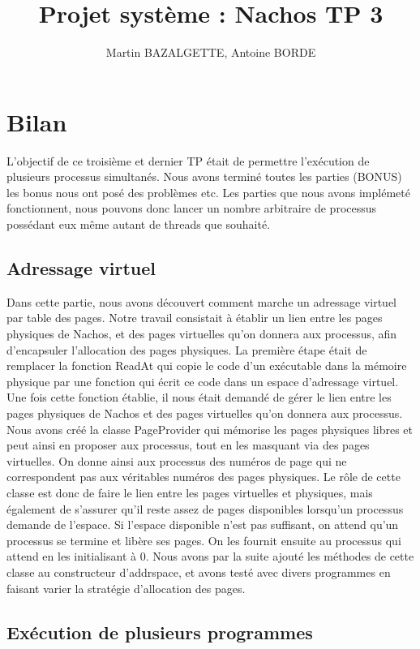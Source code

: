 \documentclass[12pt]{article}
\begin{document}
\title{Projet système : Nachos TP 3}
\author{Martin BAZALGETTE, Antoine BORDE}
\maketitle

\newpage
\tableofcontents
\newpage

\section{Bilan}
L'objectif de ce troisième et dernier TP était de permettre l'exécution de plusieurs processus simultanés.
Nous avons terminé toutes les parties (BONUS) les bonus nous ont posé des problèmes etc.
Les parties que nous avons implémeté fonctionnent, nous pouvons donc lancer un nombre arbitraire de processus possédant eux même autant de threads que souhaité.

\subsection{Adressage virtuel}

Dans cette partie, nous avons découvert comment marche un adressage virtuel par table des pages. Notre travail consistait à établir un lien entre les pages physiques de Nachos, et des pages virtuelles qu'on donnera aux processus, afin d'encapsuler l'allocation des pages physiques.
\newline
La première étape était de remplacer la fonction ReadAt qui copie le code d'un exécutable dans la mémoire physique par une fonction qui écrit ce code dans un espace d'adressage virtuel.
\newline
Une fois cette fonction établie, il nous était demandé de gérer le lien entre les pages physiques de Nachos et des pages virtuelles qu'on donnera aux processus.
Nous avons créé la classe PageProvider qui mémorise les pages physiques libres et peut ainsi en proposer aux processus, tout en les masquant via des pages virtuelles. On donne ainsi aux processus des numéros de page qui ne correspondent pas aux véritables numéros des pages physiques. Le rôle de cette classe est donc de faire le lien entre les pages virtuelles et physiques, mais également de s'assurer qu'il reste assez de pages disponibles lorsqu'un processus demande de l'espace. Si l'espace disponible n'est pas suffisant, on attend qu'un processus se termine et libère ses pages. On les fournit ensuite au processus qui attend en les initialisant à 0.
\newline
Nous avons par la suite ajouté les méthodes de cette classe au constructeur d'addrspace, et avons testé avec divers programmes en faisant varier la stratégie d'allocation des pages.

\subsection{Exécution de plusieurs programmes}
\end{document}
